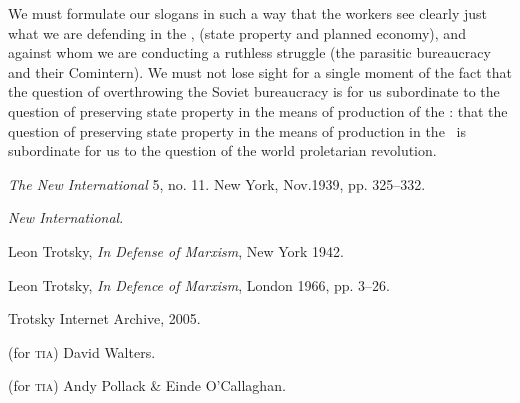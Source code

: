 We must formulate our slogans in such a way that the workers see clearly just what we are defending in the \USSR, (state property and planned economy), and against whom we are conducting a ruthless struggle (the parasitic bureaucracy and their Comintern). We must not lose sight for a single moment of the fact that the question of overthrowing the Soviet bureaucracy is for us subordinate to the question of preserving state property in the means of production of the \USSR: that the question of preserving state property in the means of production in the \USSR\ is subordinate for us to the question of the world proletarian revolution.


\newpage

\begin{letterinfo}
   \emph{The New International} 5, no. 11. New York, Nov.\@ 1939, pp. 325--332.
	
   \emph{New International}.
	
   Leon Trotsky, \emph{In Defense of Marxism}, New York 1942.
	
   Leon Trotsky, \emph{In Defence of Marxism}, London 1966, pp. 3--26.
	
   Trotsky Internet Archive, 2005.
	
   (for \textsc{tia}) David Walters.
	
   (for \textsc{tia}) Andy Pollack \& Einde O’Callaghan.
\end{letterinfo}